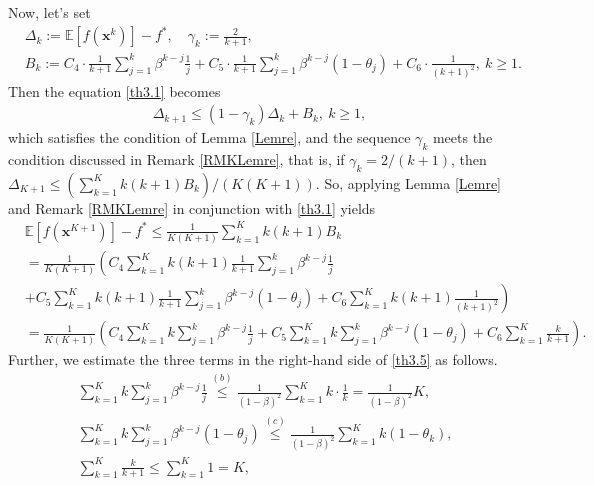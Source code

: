 \documentclass[twoside,11pt]{article}
\begin{document}
Now, let's set
\begin{align*}
   	&\Delta_k:=\mathbb{E}\left[ f(\mathbf{x}^k)\right] -f^*,
   	\quad 
   	\gamma_k:=\frac{2}{k+1},\\
   	&B_k:=C_4\cdot {\frac{1}{k+1}\sum_{j=1}^{k}\beta^{k-j} \frac{1}{j}}
   	+C_5\cdot {\frac{1}{k+1}\sum_{j=1}^{k}\beta^{k-j}(1-\theta_j)}
   	+C_6\cdot {\frac{1}{(k+1)^2}} ,\ k\ge 1.
\end{align*}
Then the equation \eqref{th3.1} becomes
\begin{align*}
   	\Delta_{k+1}\le (1-\gamma_k)\Delta_{k}+B_k,\ k\ge 1,
\end{align*}
which satisfies the condition of Lemma \ref{Lemre}, and the sequence $\gamma_k$ meets the condition discussed in Remark \ref{RMKLemre},  that is,  if $\gamma_k={2}/{(k+1)}$, then  $\Delta_{K+1}\le(\sum_{k=1}^{K}k(k+1){B_k})/(K(K+1))$. So,   applying Lemma \ref{Lemre} and Remark \ref{RMKLemre} in conjunction with \eqref{th3.1} yields
\begin{equation}\label{th3.5}
   	\begin{aligned}
   	&\mathbb{E}\left[ f(\mathbf{x}^{K+1})\right] -f^*
   	\le \frac{1}{K(K+1)}\sum_{k=1}^{K}k(k+1)B_k\\
   	&=\frac{1}{K(K+1)}  \left( C_4 \sum_{k=1}^{K}k(k+1){\frac{1}{k+1}\sum_{j=1}^{k}\beta^{k-j} \frac{1}{j}}
   	\right.\\
   	&\left.+C_5\sum_{k=1}^{K}k(k+1){\frac{1}{k+1}\sum_{j=1}^{k}\beta^{k-j}(1-\theta_j)}
   	+C_6\sum_{k=1}^{K}k(k+1){\frac{1}{(k+1)^2}}\right) \\
   	&=\frac{1}{K(K+1)}  \left( C_4 \sum_{k=1}^{K}k{\sum_{j=1}^{k}\beta^{k-j} \frac{1}{j}}
   	+C_5\sum_{k=1}^{K}k{\sum_{j=1}^{k}\beta^{k-j}(1-\theta_j)}
   	+C_6\sum_{k=1}^{K}{\frac{k}{k+1}}\right) .
   	\end{aligned}
\end{equation}
Further, we estimate the three terms in the right-hand side of \eqref{th3.5} as follows.
\begin{align}\label{th3.2}
   	&\sum_{k=1}^{K}k\sum_{j=1}^{k}\beta^{k-j}\frac{1}{j}
   	\overset{(b)}{\le}\frac{1}{(1-\beta)^2}\sum_{k=1}^{K}k\cdot\frac{1}{k}
   	=\frac{1}{(1-\beta)^2} K,\\
   	\label{th3.4}
   	&\sum_{k=1}^{K}k{\sum_{j=1}^{k}\beta^{k-j}(1-\theta_j)}
   	\overset{(c)}{\le}\frac{1}{(1-\beta)^2}\sum_{k=1}^{K}k(1-\theta_k)
   	,\\
   	\label{th3.3}
   	&\sum_{k=1}^{K}\frac{k}{k+1}
   	{\le}\sum_{k=1}^{K} 1
   	=K,
\end{align}
\end{document}
